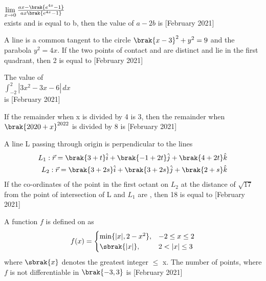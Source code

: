 \iffalse
\title{2021}
\author{EE24BTECH11063}
\section{integer}
\fi
\item $\lim \limits_{x\to 0} \frac{ax-\brak{e^{4x}-1}}{ax\brak{e^{4x}-1}} $\\
 exists and is equal to b, then the value of $a-2b$ is  \hfill{[February 2021]}
 \item A line is a common tangent to the circle $\brak{x-3}^2+y^2=9$ and the parabola $y^2=4x$. If the two points of contact  and  are distinct and lie in the first quadrant, then 2 is equal to  \hfill{[February 2021]}
 \item The value of \\
 $\int_{-2}^{2} |3x^2-3x-6| \, dx$\\
 is  \hfill{[February 2021]}
 \item If the remainder when x is divided by 4 is 3, then the remainder when $\brak{2020+x}^{2022}$ is divided by 8 is \hfill{[February 2021]}

 \item A line L passing through origin is perpendicular to the lines 
 \begin{align*}
     L_1:\vec{r}=\brak{3+t}\hat{i}+\brak{-1+2t}\hat{j}+\brak{4+2t}\hat{k}\\
     L_2:\vec{r}=\brak{3+2s}\hat{i}+\brak{3+2s}\hat{j}+\brak{2+s}\hat{k}
 \end{align*}
 If the co-ordinates of the point in the first octant on $L_2$ at the distance of $\sqrt{17}$ from the point of intersection of L and $L_1$ are , then 18 is equal to \hfill{[February 2021]}
 \item A function $f$ is defined on  as\\
 \[
f(x) = 
\begin{cases} 
\min\{|x|, 2 - x^2\}, & -2 \leq x \leq 2 \\
\sbrak{|x|}, & 2 < |x| \leq 3 
\end{cases}
\]
where $\sbrak{x}$ denotes the greatest integer $\le$ x. The number of points, where $f$ is not differentiable in $\brak{-3,3}$ is
 \hfill{[February 2021]}
 
